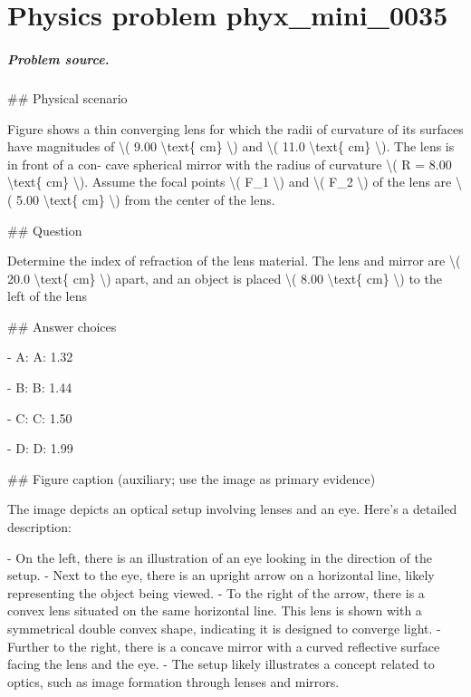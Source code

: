 
\chapter{Physics problem phyx\_mini\_0035}
\label{ch:PhyXMiniProblems_problem_phyx_mini_0035}

\paragraph{Problem source.}
\#\# Physical scenario

Figure shows a thin converging lens for which the radii of curvature of its surfaces have magnitudes of \textbackslash{}( 9.00 \textbackslash{}text\{ cm\} \textbackslash{}) and \textbackslash{}( 11.0 \textbackslash{}text\{ cm\} \textbackslash{}). The lens is in front of a con- cave spherical mirror with the radius of curvature \textbackslash{}( R = 8.00 \textbackslash{}text\{ cm\} \textbackslash{}). Assume the focal points \textbackslash{}( F\_1 \textbackslash{}) and \textbackslash{}( F\_2 \textbackslash{}) of the lens are \textbackslash{}( 5.00 \textbackslash{}text\{ cm\} \textbackslash{}) from the center of the lens.

\#\# Question

Determine the index of refraction of the lens material. The lens and mirror are \textbackslash{}( 20.0 \textbackslash{}text\{ cm\} \textbackslash{}) apart, and an object is placed \textbackslash{}( 8.00 \textbackslash{}text\{ cm\} \textbackslash{}) to the left of the lens

\#\# Answer choices

- A: A: 1.32

- B: B: 1.44

- C: C: 1.50

- D: D: 1.99

\#\# Figure caption (auxiliary; use the image as primary evidence)

The image depicts an optical setup involving lenses and an eye. Here's a detailed description:

- On the left, there is an illustration of an eye looking in the direction of the setup.
- Next to the eye, there is an upright arrow on a horizontal line, likely representing the object being viewed.
- To the right of the arrow, there is a convex lens situated on the same horizontal line. This lens is shown with a symmetrical double convex shape, indicating it is designed to converge light.
- Further to the right, there is a concave mirror with a curved reflective surface facing the lens and the eye.
- The setup likely illustrates a concept related to optics, such as image formation through lenses and mirrors.

